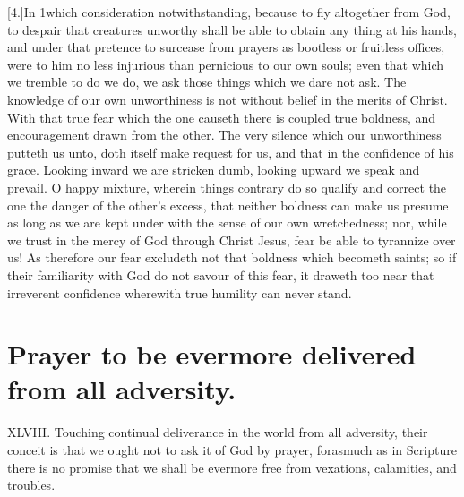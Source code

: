 [4.]In 1which consideration notwithstanding, because to fly altogether from God, to despair that creatures unworthy shall be able to obtain any thing at his hands, and under that pretence to surcease from prayers as bootless or fruitless offices, were to him no less injurious than pernicious to our own souls; even that which we tremble to do we do, we ask those things which we dare not ask. The knowledge of our own unworthiness is not without belief in the merits of Christ. With that true fear which the one causeth there is coupled true boldness, and encouragement drawn from the other. The very silence which our unworthiness putteth us unto, doth itself make request for us, and that in the confidence of his grace. Looking inward we are stricken dumb, looking upward we speak and prevail. O happy mixture, wherein things contrary do so qualify and correct the one the danger of the other’s excess, that neither boldness can make us presume as long as we are kept under with the sense of our own wretchedness; nor, while we trust in the mercy of God through Christ Jesus, fear be able to tyrannize over us! As therefore our fear excludeth not that boldness which becometh saints; so if their familiarity with God do not savour of this fear, it draweth too near that irreverent confidence wherewith true humility can never stand.


\section*{Prayer to be evermore delivered from all adversity.}
XLVIII. Touching continual deliverance in the world from all adversity, their conceit is that we ought not to ask it of God by prayer, forasmuch as in Scripture there is no promise that we shall be evermore free from vexations, calamities, and troubles.





